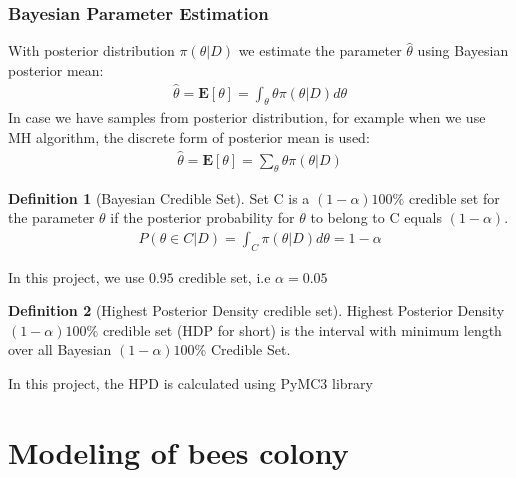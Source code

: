 \documentclass[12pt]{article}
\theoremstyle{definition}
\newtheorem{definition}{Definition}[section]
\begin{document}
\subsubsection{Bayesian Parameter Estimation}
With posterior distribution $\pi(\theta|D)$ we estimate the parameter
$\hat{\theta}$ using Bayesian posterior mean:
\begin{align*}
  \hat{\theta} = \mathbf{E}[\theta] = \int_\theta \theta \pi(\theta|D) d\theta
\end{align*}
In case we have samples from posterior distribution, for example when we use MH
algorithm, the discrete form of posterior mean is used:
\begin{align*}
  \hat{\theta} = \mathbf{E}[\theta] = \sum_\theta \theta \pi(\theta|D)
\end{align*}
\begin{definition}[Bayesian Credible Set]
  Set C is a $(1 − \alpha)100\%$ credible set for the parameter $\theta$ if the posterior
  probability for $\theta$ to belong to C equals $(1 − \alpha)$.
  \begin{align*}
    P(\theta \in C | D) = \int_C \pi(\theta|D) d\theta = 1 - \alpha
  \end{align*}
\end{definition}
In this project, we use $0.95$ credible set, i.e $\alpha=0.05$
\begin{definition}[Highest Posterior Density credible set]
  Highest Posterior Density $(1-\alpha)100\%$ credible set (HDP for short) is the
  interval with minimum length over all Bayesian $(1-\alpha)100\%$ Credible Set.
\end{definition}
In this project, the HPD is calculated using PyMC3 library
\cite{salvatier2016pymc3}

\section{Modeling of bees colony}
\end{document}
